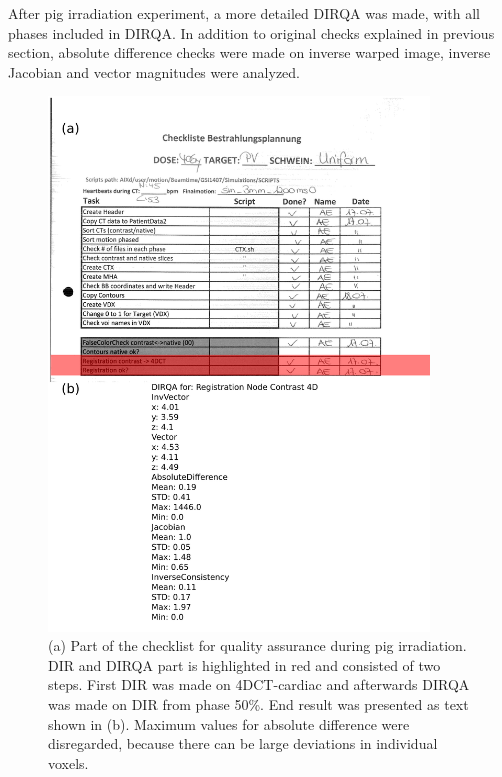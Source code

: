\documentclass[type=dr, dr=rernat, accentcolor=tud7b,colorbacktitle, bigchapter, openright, twoside, 12pt ]{tudthesis}
\begin{document}
After pig irradiation experiment, a more detailed DIRQA was made, with all phases included in DIRQA. In addition to original checks explained in previous section, absolute difference checks were made on inverse warped image, 
inverse Jacobian and vector magnitudes were analyzed.

\newpage
\begin{figure}[H]
	\begin{center}		
		\includegraphics[width=0.9\textwidth]{./Images/checkList.png}
		\caption{(a) Part of the checklist for quality assurance during pig irradiation. DIR and DIRQA part is highlighted in red and consisted of two steps. First DIR was made on 4DCT-cardiac and afterwards DIRQA was made on
		DIR from phase 50\%. End result was presented as text shown in (b). Maximum values for absolute difference were disregarded, because there can be large deviations in individual voxels.}
		\label{checkList}
	\end{center}
\end{figure}
\newpage
\end{document}
